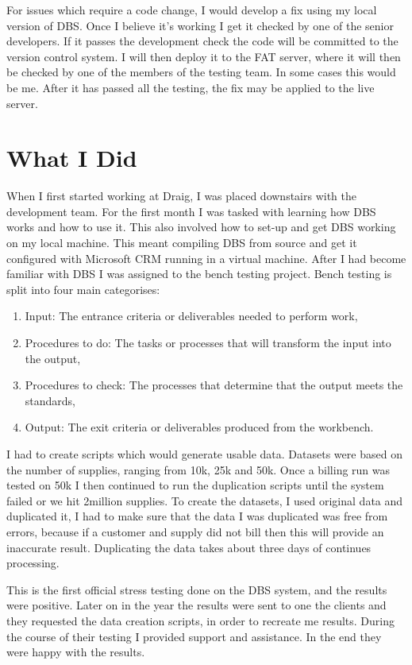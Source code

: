 \documentclass[paper=a4, fontsize=11pt]{scrartcl}	%
\begin{document}

For issues which require a code change, I would develop a fix using my local version of DBS. Once I believe it's working I get it checked by one of the senior developers. If it passes the development check the code will be committed to the version control system. I will then deploy it to the FAT server, where it will then be checked by one of the members of the testing team. In some cases this would be me. After it has passed all the testing, the fix may be applied to the live server.

\section{What I Did}
When I first started working at Draig, I was placed downstairs with the development team.  For the first month I was tasked with learning how DBS works and how to use it.  This also involved how to set-up and get DBS working on my local machine. This meant compiling DBS from source and get it configured with Microsoft CRM running in a virtual machine. After I had become familiar with DBS I was assigned to the bench testing project. Bench testing is split into four main categorises: 

\begin{enumerate}
	\item Input: The entrance criteria or deliverables needed to perform work, 
	\item Procedures to do: The tasks or processes that will transform the input into the output, 
	\item Procedures to check: The processes that determine that the output meets the standards, 
	\item Output: The exit criteria or deliverables produced from the workbench. 
\end{enumerate}


I had to create scripts which would generate usable data. Datasets were based on the number of supplies, ranging from 10k, 25k and 50k. Once a billing run was tested on 50k I then continued to run the duplication scripts until the system failed or we hit 2million supplies. To create the datasets, I used original data and duplicated it, I had to make sure that the data I was duplicated was free from errors, because if a customer and supply did not bill then this will provide an inaccurate result. Duplicating the data takes about three days of continues processing.

This is the first official stress testing done on the DBS system, and the results were positive. Later on in the year the results were sent to one the clients and they requested the data creation scripts, in order to recreate me results. During the course of their testing I provided support and assistance. In the end they were happy with the results.
\end{document}
